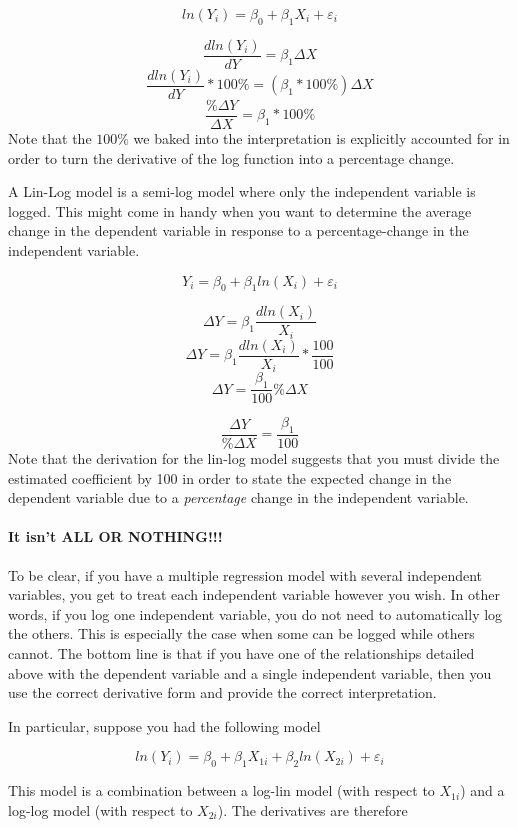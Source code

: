 \documentclass[
]{book}
\begin{document}
\[ln(Y_i)=\beta_0 + \beta_1 X_i + \varepsilon_i\]

\[\frac{dln(Y_i)}{dY} = \beta_1 \Delta X\]
\[\frac{dln(Y_i)}{dY} * 100\% = (\beta_1 * 100\%)\Delta X\]
\[\frac{\% \Delta Y}{\Delta X}= \beta_1 * 100\%\]
Note that the \(100\%\) we baked into the interpretation is explicitly accounted for in order to turn the derivative of the log function into a percentage change.

A Lin-Log model is a semi-log model where only the independent variable is logged. This might come in handy when you want to determine the average change in the dependent variable in response to a percentage-change in the independent variable.

\[Y_i=\beta_0 + \beta_1 ln(X_i) + \varepsilon_i\]

\[\Delta Y=\beta_1 \frac{dln(X_i)}{X_i}\]
\[\Delta Y=\beta_1 \frac{dln(X_i)}{X_i}*\frac{100}{100}\]
\[\Delta Y=\frac{\beta_1}{100} \%\Delta X\]

\[\frac{\Delta Y}{\%\Delta X}=\frac{\beta_1}{100} \]
Note that the derivation for the lin-log model suggests that you must divide the estimated coefficient by 100 in order to state the expected change in the dependent variable due to a \emph{percentage} change in the independent variable.

\hypertarget{it-isnt-all-or-nothing}{%
\paragraph*{It isn't ALL OR NOTHING!!!}\label{it-isnt-all-or-nothing}}

To be clear, if you have a multiple regression model with several independent variables, you get to treat each independent variable however you wish. In other words, if you log one independent variable, you do not need to automatically log the others. This is especially the case when some can be logged while others cannot. The bottom line is that if you have one of the relationships detailed above with the dependent variable and a single independent variable, then you use the correct derivative form and provide the correct interpretation.

In particular, suppose you had the following model

\[ln(Y_i)=\beta_0 + \beta_1 X_{1i} + \beta_2 ln(X_{2i}) + \varepsilon_i\]

This model is a combination between a log-lin model (with respect to \(X_{1i}\)) and a log-log model (with respect to \(X_{2i}\)). The derivatives are therefore
\end{document}
